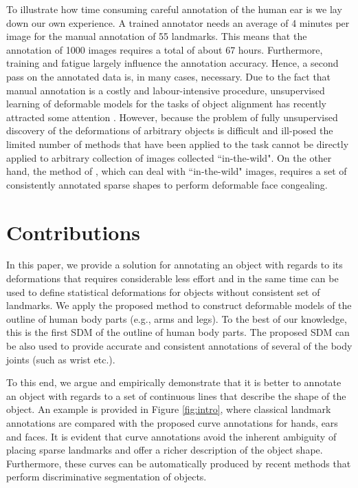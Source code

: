 To illustrate how time consuming careful annotation of the human ear is we lay down our own experience. A trained annotator needs an average of 4 minutes per image for the manual annotation of 55 landmarks. This means that the annotation of 1000 images requires a total of about 67 hours. Furthermore,  training and fatigue largely influence the annotation accuracy. Hence, a second pass on the annotated data is, in many cases, necessary. Due to the fact that manual annotation is a costly and labour-intensive procedure, unsupervised learning of deformable models for the tasks of object alignment has recently attracted some attention \cite{frey2003learning, baker2004automatic, cootes2004groupwise, jojic2006escaping, Huang2006, kokkinos2007unsupervised, jiang2009learning, liu2009simultaneous, Zhang2012}. However, because the problem of fully unsupervised discovery of the deformations of arbitrary objects is difficult and ill-posed the limited number of methods that have been applied to the task cannot be directly applied to arbitrary collection of images collected ``in-the-wild". On the other hand, the method of \cite{antonakos2014automatic}, which can deal with ``in-the-wild" images, requires a set of consistently annotated sparse shapes to perform deformable face congealing.


\section{Contributions}

In this paper, we provide a solution for annotating an object with regards to its deformations that requires considerable less effort and in the same time can be used to define statistical deformations for objects without consistent set of landmarks. We apply the proposed method to construct deformable models of the outline of  human body parts (e.g., arms and legs). To the best of our knowledge, this is the first SDM of the outline of human body parts. The proposed SDM can be also used to provide accurate and consistent annotations of several of the body joints (such as wrist etc.).

To this end, we argue and empirically demonstrate that it is better to annotate an object with regards to a set of continuous lines that describe the shape of the object. An example is provided in Figure \ref{fig:intro}, where classical landmark annotations are compared with the proposed curve annotations for hands, ears and faces. It is evident that curve annotations avoid the inherent ambiguity of placing sparse landmarks and offer a richer description of the object shape.
%
Furthermore, these curves can be automatically produced by recent methods that perform discriminative segmentation of objects.

